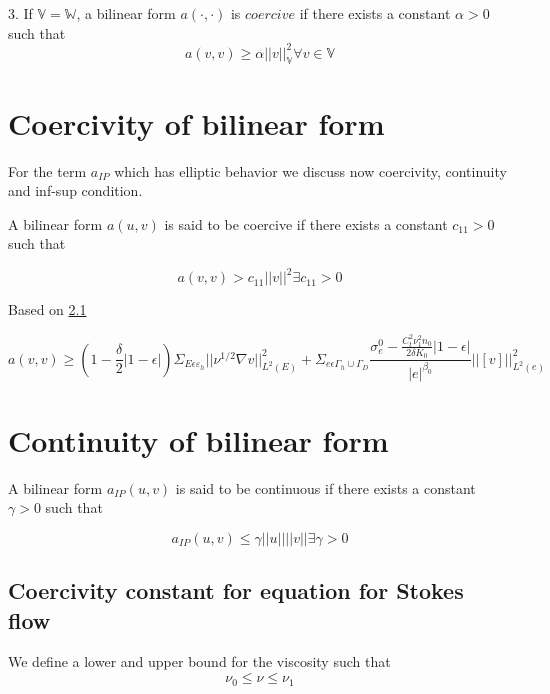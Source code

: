 \documentclass[a4paper,12pt]{book}
\begin{document}
3. If $\mathbb{V} = \mathbb{W}$, a bilinear form $a(\cdot,\cdot)$ is $coercive$ if there exists a constant $\alpha > 0$ such that \\
\begin{equation}
a(v,v) \geq \alpha ||v||_\mathbb{V}^2 \forall v \in \mathbb{V}
\end{equation}

\section{Coercivity of bilinear form} 

For the term $a_{IP}$ which has elliptic behavior we discuss now coercivity, continuity and inf-sup condition\cite{riviere}.

A bilinear form $a(u,v)$ is said to be coercive if there exists a constant $c_{11} > 0$ such that

\begin{equation}\label{Coercivity}
a(v,v) > c_{11} ||v||^2   \exists   c_{11} > 0
\end{equation}

Based on \ref{basics}

\begin{equation}\label{Coercivity_constant}
a(v,v) \geq (1-\frac{\delta}{2} |1-\epsilon|) \Sigma_{E \epsilon \varepsilon_h} ||\nu^{1/2} \nabla v ||^2_{L^2(E)} + \Sigma_{e \epsilon \Gamma_h \cup \Gamma_D} \frac{\sigma_e^0 - \frac{C_t^2 \nu_1^2 n_0}{2 \delta K_0}|1-\epsilon|}{|e|^{\beta_0}} ||[v]||^2_{L^2(e)}
\end{equation}

\section{Continuity of bilinear form}

A bilinear form $a_{IP}(u,v)$ is said to be continuous if there exists a constant $\gamma > 0$ such that

\begin{equation}\label{Continuity_constant}
a_{IP}(u,v) \leq \gamma ||u||||v||   \exists   \gamma > 0
\end{equation}


\subsection{Coercivity constant for equation for Stokes flow} \label{basics}

We define a lower and upper bound for the viscosity such that \\
\begin{equation}
\nu_0 \leq \nu \leq \nu_1
\end{equation}
\end{document}
